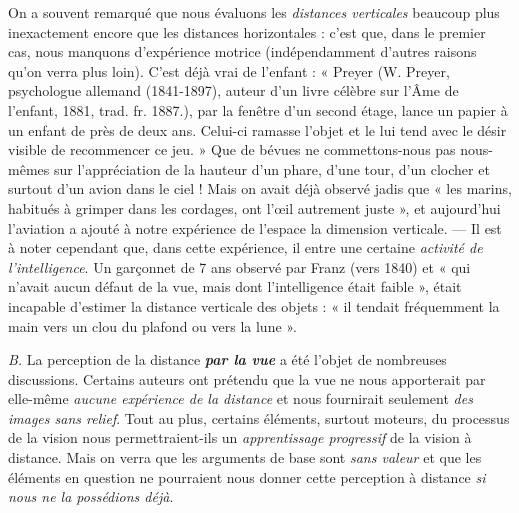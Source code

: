 {On a souvent remarqué que nous évaluons les \textsf{\textit {distances verticales}} beaucoup
plus inexactement encore que les distances horizontales : c'est que, dans le
premier cas, nous manquons d'expérience motrice (indépendamment d'autres
raisons qu’on verra plus loin). C’est déjà vrai de l'enfant :
« Preyer {\scriptsize (W. Preyer, psychologue allemand (1841-1897), auteur
d’un livre célèbre sur l'Âme de l'enfant, 1881, trad. fr. 1887.)},
par la fenêtre d’un second étage, lance un papier à un enfant de près de
deux ans. Celui-ci ramasse l’objet et le lui tend avec le désir visible de
recommencer ce jeu. » Que de bévues ne commettons-nous pas nous-mêmes sur
l’appréciation de la hauteur d'un phare, d’une tour, d’un clocher et surtout
d’un avion dans le ciel ! Mais on avait déjà observé jadis que « les marins,
habitués à grimper dans les cordages, ont l'œil autrement juste », et aujourd’hui
l’aviation a ajouté à notre expérience de l’espace la dimension verticale.
— Il est à noter cependant que, dans cette expérience, il entre une
certaine \textsf{\textit {activité de l'intelligence}}. Un garçonnet de 7 ans observé par Franz
(vers 1840) et « qui n’avait aucun défaut de la vue, mais dont l'intelligence
était faible », était incapable d’estimer la distance verticale des objets :
« il tendait fréquemment la main vers un clou du plafond ou vers la lune ».}
\vspace{0.31cm}


{\it B.} La perception de la distance \textbf{\textit {par la vue}} a été l’objet de nombreuses
discussions. Certains auteurs ont prétendu que la vue ne
nous apporterait par elle-même {\it aucune expérience de la distance} et nous
fournirait seulement {\it des images sans relief}. Tout au plus, certains
éléments, surtout moteurs, du processus de la vision nous permettraient-ils
un {\it apprentissage progressif} de la vision à distance. Mais on
verra que les arguments de base sont {\it sans valeur} et que les éléments
en question ne pourraient nous donner cette perception à distance
{\it si nous ne la possédions déjà}.

